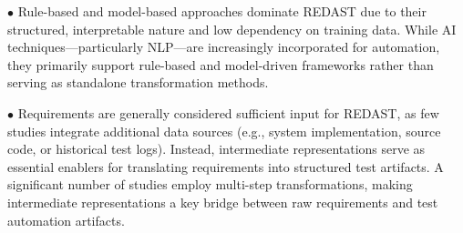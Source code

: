 \begin{tcolorbox}[mybox, title=RQ2 Key Takeaways]
$\bullet$ Rule-based and model-based approaches dominate REDAST due to their structured, interpretable nature and low dependency on training data. While AI techniques—particularly NLP—are increasingly incorporated for automation, they primarily support rule-based and model-driven frameworks rather than serving as standalone transformation methods.

$\bullet$ Requirements are generally considered sufficient input for REDAST, as few studies integrate additional data sources (e.g., system implementation, source code, or historical test logs). Instead, intermediate representations serve as essential enablers for translating requirements into structured test artifacts. A significant number of studies employ multi-step transformations, making intermediate representations a key bridge between raw requirements and test automation artifacts. 
\end{tcolorbox}

% 

